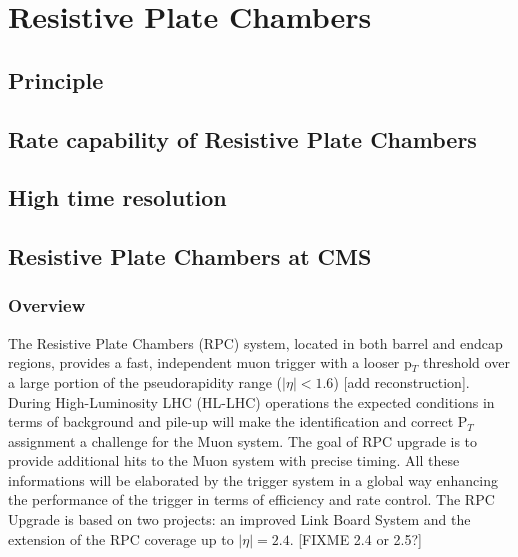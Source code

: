 \graphicspath{{chapt_dutch/}{intro/}{chapt2/}{chapt3/}{chapt4/}{chapt5/}{chapt6/}{chapt7/}}

\renewcommand\evenpagerightmark{{\scshape\small Chapter 4}}
\renewcommand\oddpageleftmark{{\scshape\small Resistive Plate Chambers}}

\renewcommand{\bibname}{References}

\hyphenation{}

\chapter[Resistive Plate Chambers]%
{Resistive Plate Chambers}
\label{chapt:4}

\section{Principle}
\label{sec:principle}

\section{Rate capability of Resistive Plate Chambers}
\label{sec:RateCapa}

\section{High time resolution}
\label{sec:TimeRes}

\section{Resistive Plate Chambers at CMS}
\label{sec:CMS-RPC}

    \subsection{Overview}
    
	The Resistive Plate Chambers (RPC) system, located in both barrel and endcap regions, provides a fast, independent muon trigger with a looser p$_T$ threshold over a large portion of the pseudorapidity range ($|\eta|<1.6$) {\color{blue} [add reconstruction]}.\\
	
	During High-Luminosity LHC (HL-LHC) operations the expected conditions in terms of background and pile-up will make the identification and correct P$_T$ assignment a challenge for the Muon system. The goal of RPC upgrade is to provide additional hits to the Muon system with precise timing. All these informations  will be elaborated by the trigger system  in a global way enhancing the performance of the trigger in terms of efficiency and rate control. The RPC Upgrade is based on two projects: an improved Link Board System and the extension of the RPC coverage up to $|\eta|=2.4$. {\color{blue} [FIXME 2.4 or 2.5?]}

